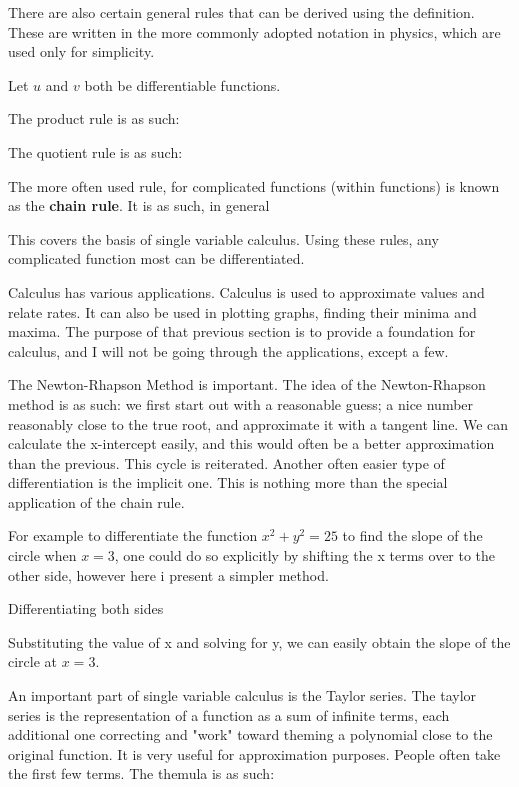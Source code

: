 There are also certain general rules that can be derived using the   definition. These are written in the more commonly adopted notation in physics, which are used only for simplicity.

Let $u$ and $v$ both be differentiable functions.

The product rule is as such:

The quotient rule is as such:

The more often used rule, for complicated functions (within functions) is known as the \textbf{chain rule}. It is as such, in general

This covers the basis of single variable calculus. Using these rules, any complicated function most can be differentiated.

Calculus has various applications. Calculus is used to approximate values and relate rates. It can also be used in plotting graphs, finding their minima and maxima. The purpose of that previous section is to provide a foundation for calculus, and I will not be going through the applications, except a few.

The Newton-Rhapson Method is important. The idea of the Newton-Rhapson method is as such: we first start out with a reasonable guess; a nice number reasonably close to the true root, and approximate it with a tangent line. We can calculate the x-intercept easily, and this would often be a better approximation than the previous. This cycle is reiterated.
Another often easier type of differentiation is the implicit one. This is nothing more than the special application of the chain rule.

For example to differentiate the function $x^2 + y^2 = 25$ to find the slope of the circle when $x=3$, one could do so explicitly by shifting the x terms over to the other side, however here i present a simpler method.

Differentiating both sides

Substituting the value of x and solving for y, we can easily obtain the slope of the circle at $x=3$.

An important part of single variable calculus is the Taylor series. The taylor series is the representation of a function as a sum of infinite terms, each additional one correcting and "work" toward theming a polynomial close to the original function. It is very useful for approximation purposes. People often take the first few terms. The themula is as such:

